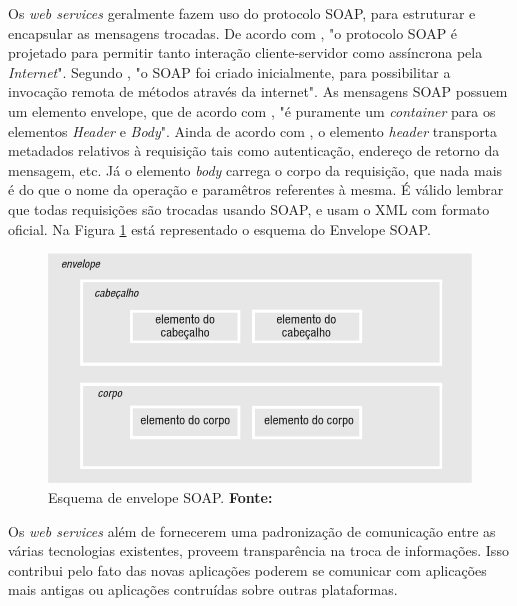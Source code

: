 	\par Os \textit{web services} geralmente fazem uso do protocolo SOAP, para
estruturar e encapsular as mensagens trocadas. De acordo com
, "o protocolo SOAP é projetado para permitir
tanto interação cliente-servidor como assíncrona pela \textit{Internet}".
Segundo , "o SOAP foi criado inicialmente, para
possibilitar a invocação remota de métodos através da internet". As mensagens
SOAP possuem um elemento envelope, que de acordo com
, "é puramente um \textit{container} para os
elementos \textit{Header} e \textit{Body}". Ainda de acordo com
, o elemento \textit{header} transporta metadados
relativos à requisição tais como autenticação, endereço de retorno da mensagem,
etc. Já o elemento \textit{body} carrega o corpo da requisição, que nada mais é
do que o nome da operação e paramêtros referentes à mesma. É válido lembrar que
todas requisições são trocadas usando SOAP, e usam o XML com formato oficial.
Na Figura \ref{fig:qt3} está representado o esquema do Envelope SOAP.
	
\begin{figure}[h!]
	\centerline{\includegraphics[scale=0.6]{./imagens/1_q_teorico/qt3.png}}
	\caption[Esquema de envelope SOAP. ]{Esquema de envelope SOAP. 
	 \textbf{Fonte:}}
	\label{fig:qt3}
\end{figure}

	\par Os \textit{web services} além de fornecerem uma padronização de
comunicação entre as várias tecnologias existentes, proveem transparência na
troca de informações. Isso contribui pelo fato das novas aplicações
poderem se comunicar com aplicações mais antigas ou aplicações contruídas sobre
outras plataformas.

